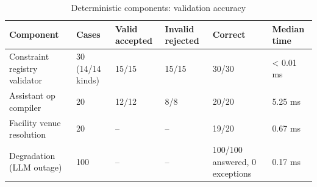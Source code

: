 \begin{table}[t]
\centering
\small
\begin{tabular}{llllll}
\toprule
Component & Cases & Valid accepted & Invalid rejected & Correct & Median time \\
\midrule
Constraint registry validator & 30 (14/14 kinds) & 15/15 & 15/15 & 30/30 & < 0.01 ms \\
Assistant op compiler & 20 & 12/12 & 8/8 & 20/20 & 5.25 ms \\
Facility venue resolution & 20 & -- & -- & 19/20 & 0.67 ms \\
Degradation (LLM outage) & 100 & -- & -- & 100/100 answered, 0 exceptions & 0.17 ms \\
\bottomrule
\end{tabular}
\caption{Deterministic components: validation accuracy}
\label{tab:t12-deterministic}
\end{table}
